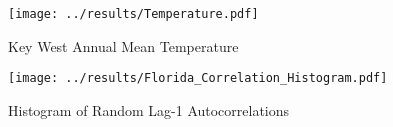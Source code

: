 \documentclass[a4paper,12pt]{article}
\begin{document}
\begin{figure}[h!]
    \centering
    \texttt{[image: ../results/Temperature.pdf]}
    \caption{Key West Annual Mean Temperature}
    \label{fig:autocorrelation}
\end{figure}

\begin{figure}[h!]
    \centering
    \texttt{[image: ../results/Florida\_Correlation\_Histogram.pdf]}
    \caption{Histogram of Random Lag-1 Autocorrelations}
    \label{fig:autocorrelation}
\end{figure}
\end{document}
